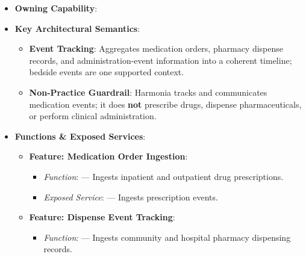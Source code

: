 \begin{itemize}

\item 
\textbf{Owning Capability}: \texttt{}



\item 
\textbf{Key Architectural Semantics}:


\begin{itemize}

\item 
\textbf{Event Tracking}: Aggregates medication orders, pharmacy dispense records, and administration-event information into a coherent timeline; bedside events are one supported context.



\item 
\textbf{Non-Practice Guardrail}: Harmonia tracks and communicates medication events; it does \textbf{not} prescribe drugs, dispense pharmaceuticals, or perform clinical administration.



\end{itemize}


\item 
\textbf{Functions \& Exposed Services}:


\begin{itemize}

\item 
\textbf{Feature: Medication Order Ingestion}:


\begin{itemize}

\item 
\emph{Function}: \texttt{} — Ingests inpatient and outpatient drug prescriptions.



\item 
\emph{Exposed Service}: \texttt{} — Ingests prescription events.



\end{itemize}


\item 
\textbf{Feature: Dispense Event Tracking}:


\begin{itemize}

\item 
\emph{Function}: \texttt{} — Ingests community and hospital pharmacy dispensing records.




\end{itemize}
\end{itemize}
\end{itemize}
